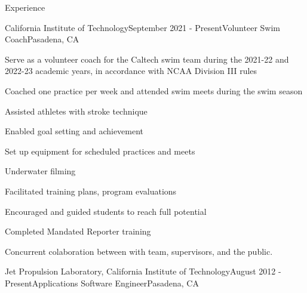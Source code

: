 \documentclass{resume} %
\begin{document}





\begin{rSection}{Experience}

\begin{rSubsection}{California Institute of Technology}{September 2021 - Present}{Volunteer Swim Coach}{Pasadena, CA}
\item  Serve as a volunteer coach for the Caltech swim team during the 2021-22 and 2022-23 academic years, in accordance with NCAA Division III rules

\item Coached one practice per week and attended swim meets during the swim season

\item Assisted athletes with stroke technique
\item Enabled goal setting and achievement
\item Set up equipment for scheduled practices and meets
\item Underwater filming
\item Facilitated training plans, program evaluations
\item Encouraged and guided students to reach full potential

\item Completed Mandated Reporter training

\item Concurrent colaboration between with team, supervisors, and the public.

\begin{rSubsection}{Jet Propulsion Laboratory, California Institute of Technology}{August 2012 - Present}{Applications Software Engineer}{Pasadena, CA}


\end{rSubsection}
\end{rSubsection}
\end{rSection}
\end{document}
